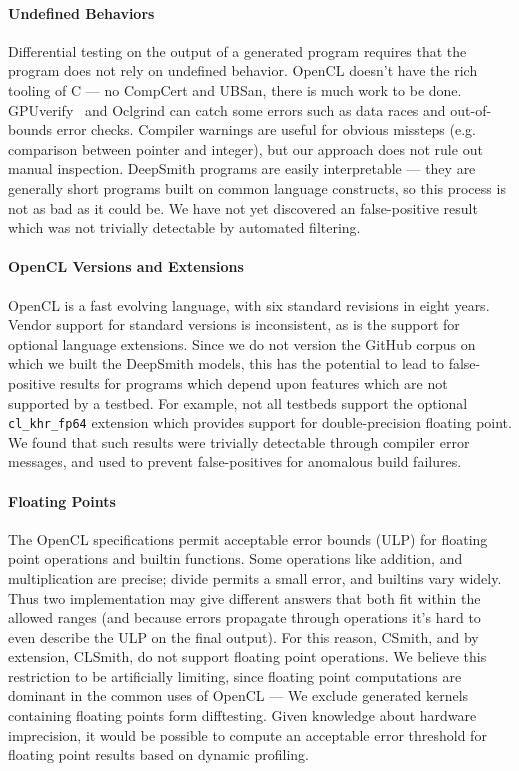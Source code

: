 \paragraph{Undefined Behaviors} %
Differential testing on the output of a generated program requires that the program does not rely on undefined behavior. OpenCL doesn't have the rich tooling of C --- no CompCert and UBSan, there is much work to be done. GPUverify~\cite{Betts2012} and Oclgrind can catch some errors such as data races and out-of-bounds error checks. Compiler warnings are useful for obvious missteps (e.g. comparison between pointer and integer), but our approach does not rule out manual inspection. DeepSmith programs are easily interpretable --- they are generally short programs built on common language constructs, so this process is not as bad as it could be. We have not yet discovered an false-positive result which was not trivially detectable by automated filtering.

\paragraph{OpenCL Versions and Extensions} OpenCL is a fast evolving language, with six standard revisions in eight years. Vendor support for standard versions is inconsistent, as is the support for optional language extensions. Since we do not version the GitHub corpus on which we built the DeepSmith models, this has the potential to lead to false-positive results for programs which depend upon features which are not supported by a testbed. For example, not all testbeds support the optional \texttt{cl\_khr\_fp64} extension which provides support for double-precision floating point. We found that such results were trivially detectable through compiler error messages, and used to prevent false-positives for anomalous build failures.

\paragraph{Floating Points} The OpenCL specifications permit acceptable error bounds (ULP) for floating point operations and builtin functions. Some operations like addition, and multiplication are precise; divide permits a small error, and builtins vary widely. Thus two implementation may give different answers that both fit within the allowed ranges (and because errors propagate through operations it's hard to even describe the ULP on the final output). For this reason, CSmith, and by extension, CLSmith, do not support floating point operations. We believe this restriction to be artificially limiting, since floating point computations are dominant in the common uses of OpenCL --- %
We exclude generated kernels containing floating points form difftesting. Given knowledge about hardware imprecision, it would be possible to compute an acceptable error threshold for floating point results based on dynamic profiling.


